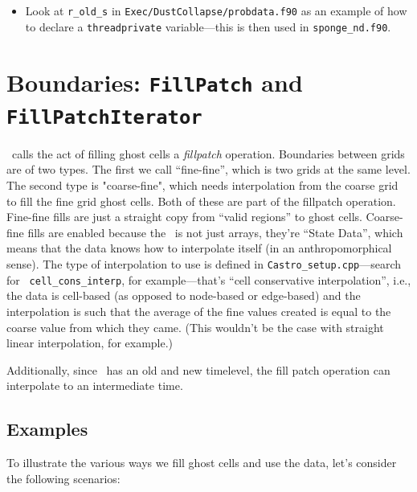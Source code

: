 \begin{itemize}
\begin{itemize}
\item Look at {\tt r\_old\_s} in {\tt Exec/DustCollapse/probdata.f90} as an
  example of how to declare a {\tt threadprivate} variable---this is then used
  in {\tt sponge\_nd.f90}.

\end{itemize}

\end{itemize}



\section{Boundaries: {\tt FillPatch} and {\tt FillPatchIterator}}

\boxlib\ calls the act of filling ghost cells a {\em fillpatch}
operation.  Boundaries between grids are of two types. The first we
call ``fine-fine'', which is two grids at the same level.  The second
type is "coarse-fine", which needs interpolation from the coarse grid
to fill the fine grid ghost cells.  Both of these are part of the
fillpatch operation.  Fine-fine fills are just a straight copy from
``valid regions'' to ghost cells.  Coarse-fine fills are enabled
because the \statedata\ is not just arrays, they're ``State Data'',
which means that the data knows how to interpolate itself (in an
anthropomorphical sense).  The type of interpolation to use is defined
in {\tt Castro\_setup.cpp}---search for {\tt
  cell\_cons\_interp}, for example---that's ``cell conservative
interpolation'', i.e., the data is cell-based (as opposed to
node-based or edge-based) and the interpolation is such that the
average of the fine values created is equal to the coarse value from
which they came.  (This wouldn't be the case with straight linear
interpolation, for example.)

Additionally, since \statedata\ has an old and new timelevel, 
the fill patch operation can interpolate to an intermediate time.

\subsection{Examples}

To illustrate the various ways we fill ghost cells and use the data,
let's consider the following scenarios:


